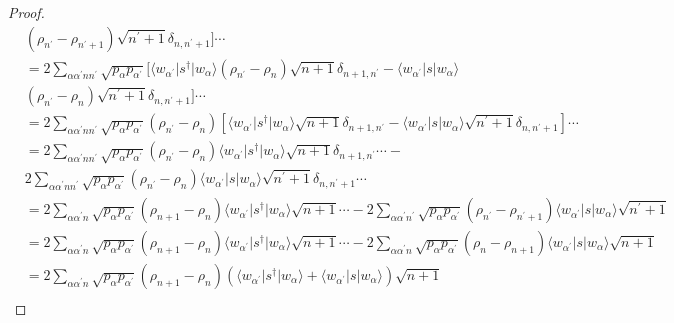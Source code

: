\documentclass[../../note.tex]{subfiles}
\begin{document}
\begin{proof}
\begin{align}
        &(\rho_{n^\prime} - \rho_{n^\prime + 1}) \sqrt{n^\prime + 1}\delta_{n,n^\prime+1}] \cdots \\
        &= 2 \sum_{\alpha \alpha^\prime n n^\prime} \sqrt{p_{\alpha} p_{\alpha^\prime}} [\langle w_{\alpha^\prime} \vert s^\dagger \vert w_{\alpha} \rangle(\rho_{n^\prime} - \rho_n) \sqrt{n+1} \delta_{n+1, n^\prime} - \langle w_{\alpha^\prime} \vert s \vert w_{\alpha} \rangle \nonumber \\
        &(\rho_{n^\prime} - \rho_{n}) \sqrt{n^\prime + 1}\delta_{n,n^\prime+1}] \cdots \\
        &= 2 \sum_{\alpha \alpha^\prime n n^\prime} \sqrt{p_{\alpha} p_{\alpha^\prime}} (\rho_{n^\prime} - \rho_n) \left[\langle w_{\alpha^\prime} \vert s^\dagger \vert w_{\alpha} \rangle \sqrt{n+1} \delta_{n+1, n^\prime} - \langle w_{\alpha^\prime} \vert s \vert w_{\alpha} \rangle
        \sqrt{n^\prime + 1}\delta_{n,n^\prime+1}\right] \cdots \\
        &= 2 \sum_{\alpha \alpha^\prime n n^\prime} \sqrt{p_{\alpha} p_{\alpha^\prime}} (\rho_{n^\prime} - \rho_n) \langle w_{\alpha^\prime} \vert s^\dagger \vert w_{\alpha} \rangle \sqrt{n+1} \delta_{n+1, n^\prime} \cdots - \nonumber \\
        &2 \sum_{\alpha \alpha^\prime n n^\prime} \sqrt{p_{\alpha} p_{\alpha^\prime}} (\rho_{n^\prime} - \rho_n) \langle w_{\alpha^\prime} \vert s \vert w_{\alpha} \rangle \sqrt{n^\prime + 1} \delta_{n, n^\prime + 1} \cdots \\
        &= 2 \sum_{\alpha \alpha^\prime n} \sqrt{p_{\alpha} p_{\alpha^\prime}} (\rho_{n+1} - \rho_n) \langle w_{\alpha^\prime} \vert s^\dagger \vert w_{\alpha} \rangle \sqrt{n+1} \cdots - 2 \sum_{\alpha \alpha^\prime n^\prime} \sqrt{p_{\alpha} p_{\alpha^\prime}} (\rho_{n^\prime} - \rho_{n^\prime + 1}) \langle w_{\alpha^\prime} \vert s \vert w_{\alpha} \rangle \sqrt{n^\prime + 1} \\
        &= 2 \sum_{\alpha \alpha^\prime n} \sqrt{p_{\alpha} p_{\alpha^\prime}} (\rho_{n+1} - \rho_n) \langle w_{\alpha^\prime} \vert s^\dagger \vert w_{\alpha} \rangle \sqrt{n+1} \cdots - 2 \sum_{\alpha \alpha^\prime n} \sqrt{p_{\alpha} p_{\alpha^\prime}} (\rho_{n} - \rho_{n + 1}) \langle w_{\alpha^\prime} \vert s \vert w_{\alpha} \rangle \sqrt{n + 1} \\
        &= 2 \sum_{\alpha \alpha^\prime n} \sqrt{p_{\alpha} p_{\alpha^\prime}} (\rho_{n+1} - \rho_n) \left(\langle w_{\alpha^\prime} \vert s^\dagger \vert w_{\alpha} \rangle + \langle w_{\alpha^\prime} \vert s \vert w_{\alpha} \rangle \right) \sqrt{n+1} \\

\end{align}
\end{proof}
\end{document}
